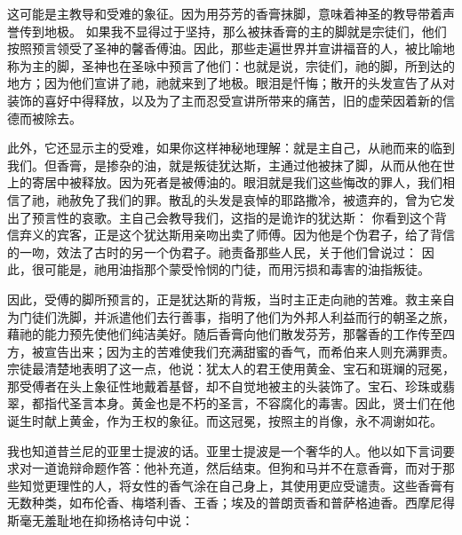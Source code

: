 这可能是主教导和受难的象征。因为用芬芳的香膏抹脚，意味着神圣的教导带着声誉传到地极。 如果我不显得过于坚持，那么被抹香膏的主的脚就是宗徒们，他们按照预言领受了圣神的馨香傅油。因此，那些走遍世界并宣讲福音的人，被比喻地称为主的脚，圣神也在圣咏中预言了他们：也就是说，宗徒们，祂的脚，所到达的地方；因为他们宣讲了祂，祂就来到了地极。眼泪是忏悔；散开的头发宣告了从对装饰的喜好中得释放，以及为了主而忍受宣讲所带来的痛苦，旧的虚荣因着新的信德而被除去。\par

此外，它还显示主的受难，如果你这样神秘地理解：就是主自己，从祂而来的临到我们。但香膏，是掺杂的油，就是叛徒犹达斯，主通过他被抹了脚，从而从他在世上的寄居中被释放。因为死者是被傅油的。眼泪就是我们这些悔改的罪人，我们相信了祂，祂赦免了我们的罪。散乱的头发是哀悼的耶路撒冷，被遗弃的，曾为它发出了预言性的哀歌。主自己会教导我们，这指的是诡诈的犹达斯：  你看到这个背信弃义的宾客，正是这个犹达斯用亲吻出卖了师傅。因为他是个伪君子，给了背信的一吻，效法了古时的另一个伪君子。祂责备那些人民，关于他们曾说过：  因此，很可能是，祂用油指那个蒙受怜悯的门徒，而用污损和毒害的油指叛徒。\par

因此，受傅的脚所预言的，正是犹达斯的背叛，当时主正走向祂的苦难。救主亲自为门徒们洗脚，并派遣他们去行善事，指明了他们为外邦人利益而行的朝圣之旅，藉祂的能力预先使他们纯洁美好。随后香膏向他们散发芬芳，那馨香的工作传至四方，被宣告出来；因为主的苦难使我们充满甜蜜的香气，而希伯来人则充满罪责。宗徒最清楚地表明了这一点，他说：犹太人的君王使用黄金、宝石和斑斓的冠冕，那受傅者在头上象征性地戴着基督，却不自觉地被主的头装饰了。宝石、珍珠或翡翠，都指代圣言本身。黄金也是不朽的圣言，不容腐化的毒害。因此，贤士们在他诞生时献上黄金，作为王权的象征。而这冠冕，按照主的肖像，永不凋谢如花。\par

我也知道昔兰尼的亚里士提波的话。亚里士提波是一个奢华的人。他以如下言词要求对一道诡辩命题作答：他补充道，然后结束。但狗和马并不在意香膏，而对于那些知觉更理性的人，将女性的香气涂在自己身上，其使用更应受谴责。这些香膏有无数种类，如布伦香、梅塔利香、王香；埃及的普朗贡香和普萨格迪香。西摩尼得斯毫无羞耻地在抑扬格诗句中说：\par

